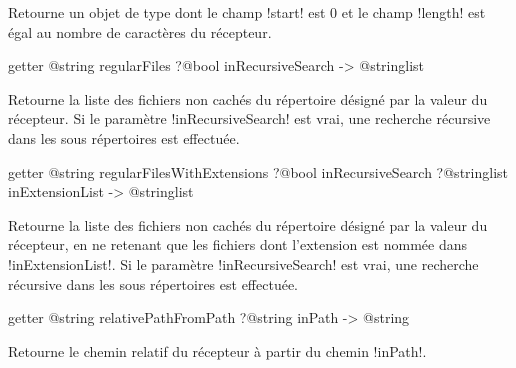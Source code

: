 Retourne un objet de type  dont le champ \ggst!start! est $0$ et le champ \ggst!length! est égal au nombre de caractères du récepteur.









\begin{galgas3box}
getter @string regularFiles ?@bool inRecursiveSearch -> @stringlist
\end{galgas3box}

Retourne la liste des fichiers non cachés du répertoire désigné par la valeur du récepteur. Si le paramètre \ggst!inRecursiveSearch! est vrai, une recherche récursive dans les sous répertoires est effectuée.










\begin{galgas3box}
getter @string regularFilesWithExtensions
    ?@bool inRecursiveSearch
    ?@stringlist inExtensionList -> @stringlist
\end{galgas3box}

Retourne la liste des fichiers non cachés du répertoire désigné par la valeur du récepteur, en ne retenant que les fichiers dont l'extension est nommée dans \ggst!inExtensionList!. Si le paramètre \ggst!inRecursiveSearch! est vrai, une recherche récursive dans les sous répertoires est effectuée.










\begin{galgas3box}
getter @string relativePathFromPath ?@string inPath -> @string
\end{galgas3box}

Retourne le chemin relatif du récepteur à partir du chemin \ggst!inPath!.










